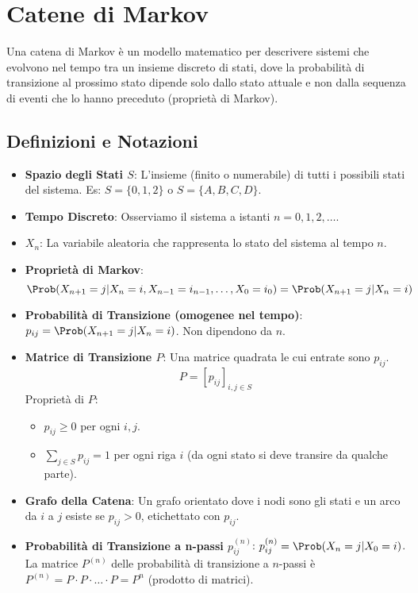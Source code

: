 \chapter{Catene di Markov}
\label{cap:markov}
Una catena di Markov è un modello matematico per descrivere sistemi che evolvono nel tempo tra un insieme discreto di stati, dove la probabilità di transizione al prossimo stato dipende solo dallo stato attuale e non dalla sequenza di eventi che lo hanno preceduto (proprietà di Markov).

\section{Definizioni e Notazioni}
\begin{itemize}
    \item \textbf{Spazio degli Stati $S$}: L'insieme (finito o numerabile) di tutti i possibili stati del sistema. Es: $S=\{0, 1, 2\}$ o $S=\{A, B, C, D\}$.
    \item \textbf{Tempo Discreto}: Osserviamo il sistema a istanti $n=0, 1, 2, \dots$.
    \item \textbf{$X_n$}: La variabile aleatoria che rappresenta lo stato del sistema al tempo $n$.
    \item \textbf{Proprietà di Markov}:
    \[ \Prob(X_{n+1}=j | X_n=i, X_{n-1}=i_{n-1}, \dots, X_0=i_0) = \Prob(X_{n+1}=j | X_n=i) \]
    \item \textbf{Probabilità di Transizione (omogenee nel tempo)}: $p_{ij} = \Prob(X_{n+1}=j | X_n=i)$. Non dipendono da $n$.
    \item \textbf{Matrice di Transizione $P$}: Una matrice quadrata le cui entrate sono $p_{ij}$.
    \[ P = [p_{ij}]_{i,j \in S} \]
    Proprietà di $P$:
    \begin{itemize}
        \item $p_{ij} \ge 0$ per ogni $i,j$.
        \item $\sum_{j \in S} p_{ij} = 1$ per ogni riga $i$ (da ogni stato si deve transire da qualche parte).
    \end{itemize}
    \item \textbf{Grafo della Catena}: Un grafo orientato dove i nodi sono gli stati e un arco da $i$ a $j$ esiste se $p_{ij}>0$, etichettato con $p_{ij}$.
    \item \textbf{Probabilità di Transizione a n-passi $p_{ij}^{(n)}$}: $p_{ij}^{(n)} = \Prob(X_n=j | X_0=i)$.
    La matrice $P^{(n)}$ delle probabilità di transizione a $n$-passi è $P^{(n)} = P \cdot P \cdot \dots \cdot P = P^n$ (prodotto di matrici).
\end{itemize}

